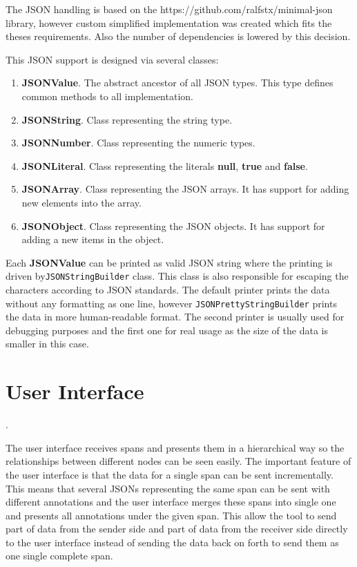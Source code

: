 The JSON handling is based on the https://github.com/ralfstx/minimal-json library, however custom simplified implementation was created which fits the theses requirements. Also the number of dependencies is lowered by this decision. 

This JSON support is designed via several classes:
\begin{enumerate}
	\item \textbf{JSONValue}. The abstract ancestor of all JSON types. This type defines common methods to all implementation.
	\item \textbf{JSONString}. Class representing the string type.
	\item \textbf{JSONNumber}. Class representing the numeric types.
	\item \textbf{JSONLiteral}. Class representing the literals \textbf{null}, \textbf{true} and \textbf{false}.
	\item \textbf{JSONArray}. Class representing the JSON arrays. It has support for adding new elements into the array.
	\item \textbf{JSONObject}. Class representing the JSON objects. It has support for adding a new items in the object.
\end{enumerate}

Each \textbf{JSONValue} can be printed as valid JSON string where the printing is driven by\texttt{JSONStringBuilder} class. This class is also responsible for escaping the characters according to JSON standards. The default printer prints the data without any formatting as one line, however \texttt{JSONPrettyStringBuilder} prints the data in more human-readable format. The second printer is usually used for debugging purposes and the first one for real usage as the size of the data is smaller in this case.

\section{User Interface}
\label{sec:zipkin_ui}.

The user interface receives spans and presents them in a hierarchical way so the relationships between different nodes can be seen easily. The important feature of the user interface is that the data for a single span can be sent incrementally. This means that several JSONs representing the same span can be sent with different annotations and the user interface merges these spans into single one and presents all annotations under the given span. This allow the tool to send part of data from the sender side and part of data from the receiver side directly to the user interface instead of sending the data back on forth to send them as one single complete span.


